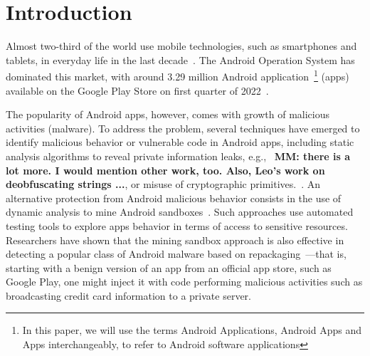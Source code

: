 \section{Introduction}\label{sec:introduction}

Almost two-third of the world use mobile technologies, such as smartphones and tablets, in everyday life in the last decade~\cite{Comscore,DBLP:journals/tse/MartinSJZH17}. The Android Operation System has dominated this market, with around 3.29 million Android application~\footnote{In this paper, we will use the terms Android Applications, Android Apps and Apps interchangeably, to refer to Android software applications} (apps) available on the Google Play Store on first quarter of 2022~\cite{Statista}. 

The popularity of Android apps, however,
comes with growth of malicious activities (malware).  
To address the problem,
several techniques have emerged to identify malicious behavior or vulnerable code in Android apps, 
including static analysis algorithms to reveal private information 
leaks, e.g.,~\cite{DBLP:conf/pldi/ArztRFBBKTOM14} \textbf{MM: there is a lot more. I would mention other work, too. Also, Leo's work on deobfuscating strings ...}, or misuse of 
cryptographic primitives.~\cite{DBLP:journals/tse/KrugerSABM21}. 
An alternative
protection from Android malicious behavior consists in the use of dynamic analysis to mine Android sandboxes~\cite{DBLP:conf/icse/JamrozikSZ16}. Such approaches use automated testing tools 
to explore apps behavior in terms of access to sensitive resources. Researchers have shown that the mining sandbox approach is also effective in detecting a popular class of Android malware based on repackaging~\cite{DBLP:conf/wcre/BaoLL18,le2018towards}---that is, starting with a benign version of an app from an official app store, such as Google Play, one might inject it with code performing malicious activities such as broadcasting credit card information to a private server.~\cite{DBLP:journals/tse/LiBK21} %

